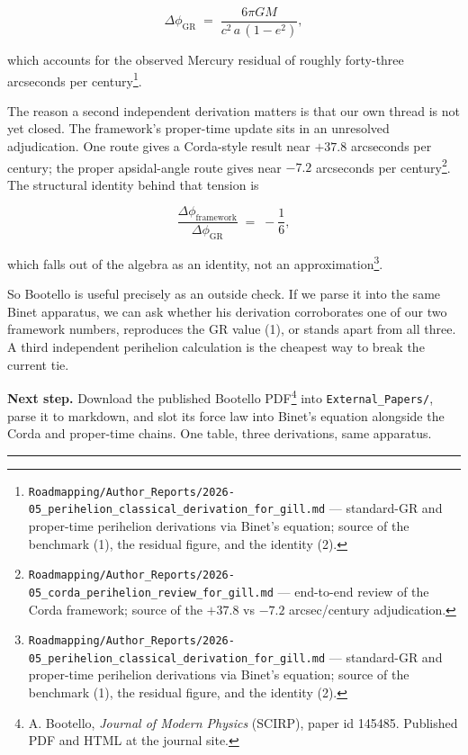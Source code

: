 \documentclass[
  11pt,
]{article}
\begin{document}
\[
\Delta\phi_{\text{GR}} \;=\; \frac{6\pi G M}{c^{2}\,a\,(1-e^{2})}, \tag{1}
\]

which accounts for the observed Mercury residual of roughly forty-three
arcseconds per century\footnote{\texttt{Roadmapping/Author\_Reports/2026-05\_perihelion\_classical\_derivation\_for\_gill.md}
  --- standard-GR and proper-time perihelion derivations via Binet's
  equation; source of the benchmark (1), the residual figure, and the
  identity (2).}.

The reason a second independent derivation matters is that our own
thread is not yet closed. The framework's proper-time update sits in an
unresolved adjudication. One route gives a Corda-style result near
\(+37.8\) arcseconds per century; the proper apsidal-angle route gives
near \(-7.2\) arcseconds per century\footnote{\texttt{Roadmapping/Author\_Reports/2026-05\_corda\_perihelion\_review\_for\_gill.md}
  --- end-to-end review of the Corda framework; source of the \(+37.8\)
  vs \(-7.2\) arcsec/century adjudication.}. The structural identity
behind that tension is

\[
\frac{\Delta\phi_{\text{framework}}}{\Delta\phi_{\text{GR}}} \;=\; -\frac{1}{6}, \tag{2}
\]

which falls out of the algebra as an identity, not an
approximation\footnote{\texttt{Roadmapping/Author\_Reports/2026-05\_perihelion\_classical\_derivation\_for\_gill.md}
  --- standard-GR and proper-time perihelion derivations via Binet's
  equation; source of the benchmark (1), the residual figure, and the
  identity (2).}.

So Bootello is useful precisely as an outside check. If we parse it into
the same Binet apparatus, we can ask whether his derivation corroborates
one of our two framework numbers, reproduces the GR value (1), or stands
apart from all three. A third independent perihelion calculation is the
cheapest way to break the current tie.

\textbf{Next step.} Download the published Bootello PDF\footnote{A.
  Bootello, \emph{Journal of Modern Physics} (SCIRP), paper id 145485.
  Published PDF and HTML at the journal site.} into
\texttt{External\_Papers/}, parse it to markdown, and slot its force law
into Binet's equation alongside the Corda and proper-time chains. One
table, three derivations, same apparatus.

\begin{center}\rule{0.5\linewidth}{0.5pt}\end{center}
\end{document}
